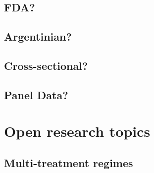 \documentclass[11pt,titlepage]{article}
\begin{document}
\subsection{FDA?}
\subsection{Argentinian?}
\subsection{Cross-sectional?}
\subsection{Panel Data?}
                                                                                                                                                             
 
\section{Open research topics}
\subsection{Multi-treatment regimes}
\end{document}
